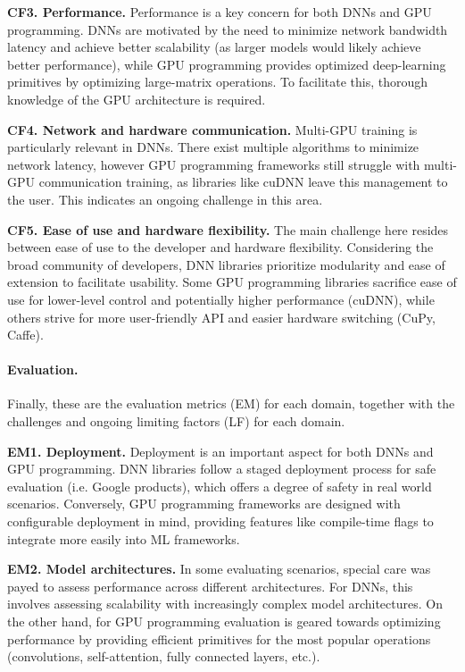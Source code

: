 \textbf{CF3. Performance.}
Performance is a key concern for both DNNs and GPU programming. DNNs are
motivated by the need to minimize network bandwidth latency and achieve better scalability (as larger
models would likely achieve better performance), while GPU programming provides optimized deep-learning
primitives by optimizing large-matrix operations. To facilitate this, thorough knowledge of the GPU
architecture is required.





\textbf{CF4. Network and hardware communication.}
Multi-GPU training is particularly relevant in DNNs. There exist multiple algorithms to minimize
network latency, however GPU programming frameworks still struggle with multi-GPU communication
training, as libraries like cuDNN leave this management to the user. This indicates an ongoing challenge
in this area.

\textbf{CF5. Ease of use and hardware flexibility.}
The main challenge here resides between ease of use to the developer and hardware flexibility.
Considering the broad community of developers, DNN libraries prioritize modularity and ease of
extension to facilitate usability. Some GPU programming libraries sacrifice ease of use for lower-level control
and potentially higher performance (cuDNN), while others strive for more user-friendly API and easier
hardware switching (CuPy, Caffe).
\paragraph{Evaluation.}
Finally, these are the evaluation metrics (EM) for each domain, together with the challenges and
ongoing limiting factors (LF) for each domain.

\textbf{EM1. Deployment.}
Deployment is an important aspect for both DNNs and GPU programming. DNN libraries follow a staged
deployment process for safe evaluation (i.e. Google products), which offers a degree of safety in
real world scenarios. Conversely, GPU programming frameworks are designed with configurable deployment
in mind, providing features like compile-time flags to integrate more easily into ML frameworks.

\textbf{EM2. Model architectures.}
In some evaluating scenarios, special care was payed to assess performance across different architectures.
For DNNs, this involves assessing scalability with increasingly complex model architectures. On the other hand,
for GPU programming evaluation is geared towards optimizing performance by providing efficient primitives
for the most popular operations (convolutions, self-attention, fully connected layers, etc.).

